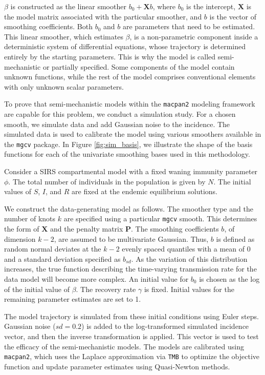 \documentclass[
11pt, %
oneside, %
english, %
singlespacing, %
]{macthesis} %
\begin{document}
\(\beta\) is constructed as the linear smoother \(b_0 + \mathbf{X}b\), where \(b_0\) is the intercept, \(\mathbf{X}\) is the model matrix associated with the particular smoother, and \(b\) is the vector of smoothing coefficients. Both \(b_0\) and \(b\) are parameters that need to be estimated. This linear smoother, which estimates \(\beta\), is a non-parametric component inside a deterministic system of differential equations, whose trajectory is determined entirely by the starting parameters. This is why the model is called semi-mechanistic or partially specified. Some components of the model contain unknown functions, while the rest of the model comprises conventional elements with only unknown scalar parameters.

To prove that semi-mechanistic models within the \texttt{macpan2} modeling framework are capable for this problem, we conduct a simulation study. For a chosen smooth, we simulate data and add Gaussian noise to the incidence. The simulated data is used to calibrate the model using various smoothers available in the \texttt{mgcv} package. In Figure \ref{fig:sim_basis}, we illustrate the shape of the basis functions for each of the univariate smoothing bases used in this methodology.

Consider a SIRS compartmental model with a fixed waning immunity parameter \(\phi\). The total number of individuals in the population is given by \(N\). The initial values of \(S\), \(I\), and \(R\) are fixed at the endemic equilibrium solutions.

We construct the data-generating model as follows. The smoother type and the number of knots \(k\) are specified using a particular \texttt{mgcv} smooth. This determines the form of \(\mathbf{X}\) and the penalty matrix \(\mathbf{P}\). The smoothing coefficients \(b\), of dimension \(k-2\), are assumed to be multivariate Gaussian. Thus, \(b\) is defined as random normal deviates at the \(k-2\) evenly spaced quantiles with a mean of 0 and a standard deviation specified as \(b_{sd}\). As the variation of this distribution increases, the true function describing the time-varying transmission rate for the data model will become more complex. An initial value for \(b_0\) is chosen as the log of the initial value of \(\beta\). The recovery rate \(\gamma\) is fixed. Initial values for the remaining parameter estimates are set to 1.

The model trajectory is simulated from these initial conditions using Euler steps. Gaussian noise (\(sd = 0.2\)) is added to the log-transformed simulated incidence vector, and then the inverse transformation is applied. This vector is used to test the efficacy of the semi-mechanistic models. The models are calibrated using \texttt{macpan2}, which uses the Laplace approximation via \texttt{TMB} to optimize the objective function and update parameter estimates using Quasi-Newton methods.
\end{document}
